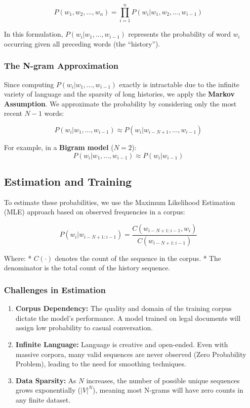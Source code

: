 \documentclass[
  italian,
  11pt,
]{article}
\providecommand{\tightlist}{%
  \setlength{\itemsep}{0pt}\setlength{\parskip}{0pt}}
\begin{document}
\[P(w_1, w_2, \dots, w_n) = \prod_{i=1}^{n} P(w_i | w_1, w_2, \dots, w_{i-1})\]

In this formulation, \(P(w_i | w_1, \dots, w_{i-1})\) represents the
probability of word \(w_i\) occurring given all preceding words (the
``history'').

\subsubsection{The N-gram Approximation}\label{the-n-gram-approximation}

Since computing \(P(w_i | w_1, \dots, w_{i-1})\) exactly is intractable
due to the infinite variety of language and the sparsity of long
histories, we apply the \textbf{Markov Assumption}. We approximate the
probability by considering only the most recent \(N-1\) words:

\[P(w_i | w_1, \dots, w_{i-1}) \approx P(w_i | w_{i-N+1}, \dots, w_{i-1})\]

For example, in a \textbf{Bigram model} (\(N=2\)):
\[P(w_i | w_1, \dots, w_{i-1}) \approx P(w_i | w_{i-1})\]

\subsection{Estimation and Training}\label{estimation-and-training}

To estimate these probabilities, we use the Maximum Likelihood
Estimation (MLE) approach based on observed frequencies in a corpus:

\[P(w_i | w_{i-N+1:i-1}) = \frac{C(w_{i-N+1:i-1}, w_i)}{C(w_{i-N+1:i-1})}\]

Where: * \(C(\cdot)\) denotes the count of the sequence in the corpus. *
The denominator is the total count of the history sequence.

\subsubsection{Challenges in Estimation}\label{challenges-in-estimation}

\begin{enumerate}
\def\labelenumi{\arabic{enumi}.}
\tightlist
\item
  \textbf{Corpus Dependency:} The quality and domain of the training
  corpus dictate the model's performance. A model trained on legal
  documents will assign low probability to casual conversation.
\item
  \textbf{Infinite Language:} Language is creative and open-ended. Even
  with massive corpora, many valid sequences are never observed (Zero
  Probability Problem), leading to the need for smoothing techniques.
\item
  \textbf{Data Sparsity:} As \(N\) increases, the number of possible
  unique sequences grows exponentially (\(|V|^N\)), meaning most N-grams
  will have zero counts in any finite dataset.
\end{enumerate}
\end{document}
